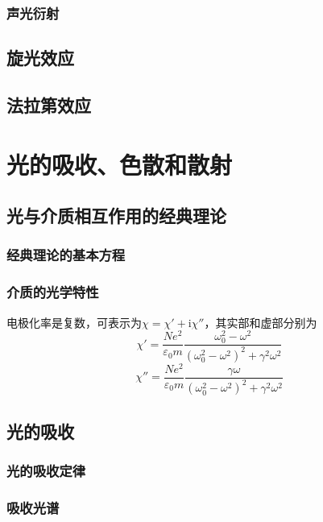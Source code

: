 \documentclass[cn,10pt,chinesefont=founder,math=mtpro2,cite=super,toc=onecol,twoside]{elegantbook}
\begin{document}
\subsection{声光衍射}

\section{旋光效应}

\section{法拉第效应}

\chapter{光的吸收、色散和散射}

\section{光与介质相互作用的经典理论}

\subsection{经典理论的基本方程}

\subsection{介质的光学特性}

电极化率是复数，可表示为$\chi=\chi'+\mathrm{i}\chi''$，其实部和虚部分别为
\begin{equation}
\chi'=\frac{Ne^2}{\varepsilon_0m}\frac{\omega^2_0-\omega^2}{(\omega^2_0-\omega^2)^2+\gamma^2\omega^2}
\end{equation}
\begin{equation}
\chi''=\frac{Ne^2}{\varepsilon_0m}\frac{\gamma\omega}{(\omega^2_0-\omega^2)^2+\gamma^2\omega^2}
\end{equation}

\section{光的吸收}

\subsection{光的吸收定律}

\subsection{吸收光谱}
\end{document}
